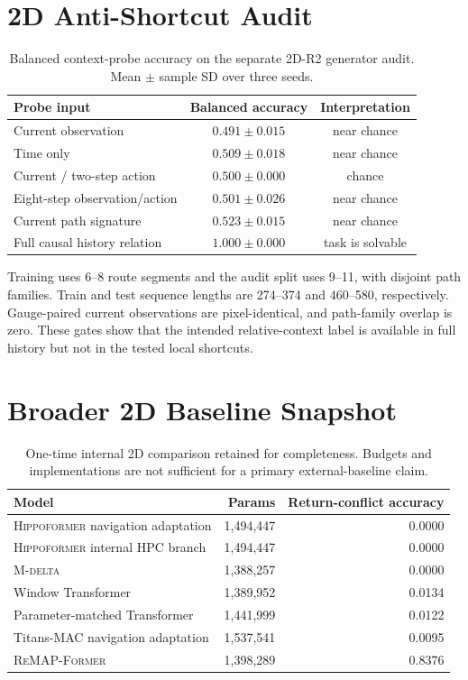 \documentclass{article}
\newcommand{\model}{\textsc{ReMAP-Former}}
\newcommand{\hippo}{\textsc{Hippoformer}}
\newcommand{\mdelta}{\textsc{M-delta}}
\newcommand{\hpc}{\textsc{HPC}}
\begin{document}
\section{2D Anti-Shortcut Audit}

\begin{table}[h]
\centering
\caption{Balanced context-probe accuracy on the separate 2D-R2 generator audit. Mean $\pm$ sample SD over three seeds.}
\label{tab:shortcut}
\small
\begin{tabular}{lcc}
\toprule
Probe input & Balanced accuracy & Interpretation\\
\midrule
Current observation & $0.491\pm0.015$ & near chance\\
Time only & $0.509\pm0.018$ & near chance\\
Current / two-step action & $0.500\pm0.000$ & chance\\
Eight-step observation/action & $0.501\pm0.026$ & near chance\\
Current path signature & $0.523\pm0.015$ & near chance\\
Full causal history relation & $1.000\pm0.000$ & task is solvable\\
\bottomrule
\end{tabular}
\end{table}

Training uses 6--8 route segments and the audit split uses 9--11, with disjoint path families.
Train and test sequence lengths are 274--374 and 460--580, respectively.
Gauge-paired current observations are pixel-identical, and path-family overlap is zero.
These gates show that the intended relative-context label is available in full history but not in the tested local shortcuts.

\section{Broader 2D Baseline Snapshot}

\begin{table}[h]
\centering
\caption{One-time internal 2D comparison retained for completeness. Budgets and implementations are not sufficient for a primary external-baseline claim.}
\label{tab:broader}
\small
\begin{tabular}{lrr}
\toprule
Model & Params & Return-conflict accuracy\\
\midrule
\hippo{} navigation adaptation & 1,494,447 & 0.0000\\
\hippo{} internal \hpc{} branch & 1,494,447 & 0.0000\\
\mdelta{} & 1,388,257 & 0.0000\\
Window Transformer & 1,389,952 & 0.0134\\
Parameter-matched Transformer & 1,441,999 & 0.0122\\
Titans-MAC navigation adaptation & 1,537,541 & 0.0095\\
\model{} & 1,398,289 & 0.8376\\
\bottomrule
\end{tabular}
\end{table}
\end{document}
